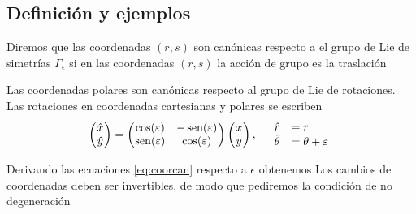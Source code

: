 \subsection{Definición y ejemplos}
\begin{definicion}   Diremos que las coordenadas $(r,s)$ son canónicas respecto a el grupo de Lie de simetrías $\Gamma_{\epsilon}$  si en las coordenadas $(r,s)$ la acción de grupo es la traslación

\end{definicion}
 \begin{ejemplo} Las coordenadas polares son canónicas respecto al grupo de Lie de rotaciones. Las rotaciones en coordenadas cartesianas y polares se escriben
\[
 \begin{pmatrix} \hat{x}\\ \hat{y}
\end{pmatrix}=\begin{pmatrix} \cos(\varepsilon) & -\operatorname{sen}(\varepsilon)
\\ \operatorname{sen}(\varepsilon) & \cos(\varepsilon)
\end{pmatrix} \begin{pmatrix} x\\ y
\end{pmatrix},\quad \begin{array}{ll} \hat{r}&=r\\ \hat{\theta}&=\theta+\varepsilon\\ 
\end{array}
\]
\end{ejemplo}

Derivando las ecuaciones \eqref{eq:coorcan} respecto a $\epsilon$ obtenemos
 Los cambios de coordenadas deben ser invertibles, de modo que pediremos la condición de no degeneración





